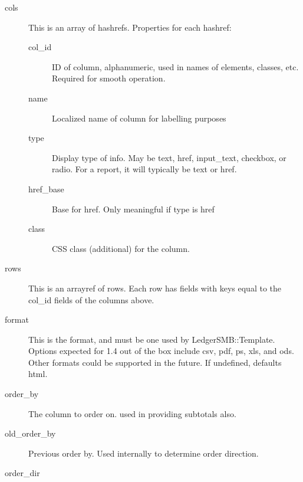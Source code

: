 \begin{description}
\begin{description}
\begin{description}
\begin{description}
\begin{description}
\begin{description}
\begin{description}
\begin{description}
\begin{description}
\begin{description}
\begin{description}
\item[{cols}] \mbox{}

This is an array of hashrefs.  Properties for each hashref:

\begin{description}

\item[{col\_id}] \mbox{}

ID of column, alphanumeric, used in names of elements, classes, etc.  Required
for smooth operation.


\item[{name}] \mbox{}

Localized name of column for labelling purposes


\item[{type}] \mbox{}

Display type of info.  May be text, href, input\_text, checkbox, or radio.  For a
report, it will typically be text or href.


\item[{href\_base}] \mbox{}

Base for href.  Only meaningful if type is href


\item[{class}] \mbox{}

CSS class (additional) for the column.

\end{description}

\item[{rows}] \mbox{}

This is an arrayref of rows.  Each row has fields with keys equal to the col\_id
fields of the columns above.


\item[{format}] \mbox{}

This is the format, and must be one used by LedgerSMB::Template.  Options
expected for 1.4 out of the box include csv, pdf, ps, xls, and ods.  Other
formats could be supported in the future.  If undefined, defaults html.


\item[{order\_by}] \mbox{}

The column to order on.  used in providing subtotals also.


\item[{old\_order\_by}] \mbox{}

Previous order by.  Used internally to determine order direction.


\item[{order\_dir}] \mbox{}


\end{description}
\end{description}
\end{description}
\end{description}
\end{description}
\end{description}
\end{description}
\end{description}
\end{description}
\end{description}
\end{description}
